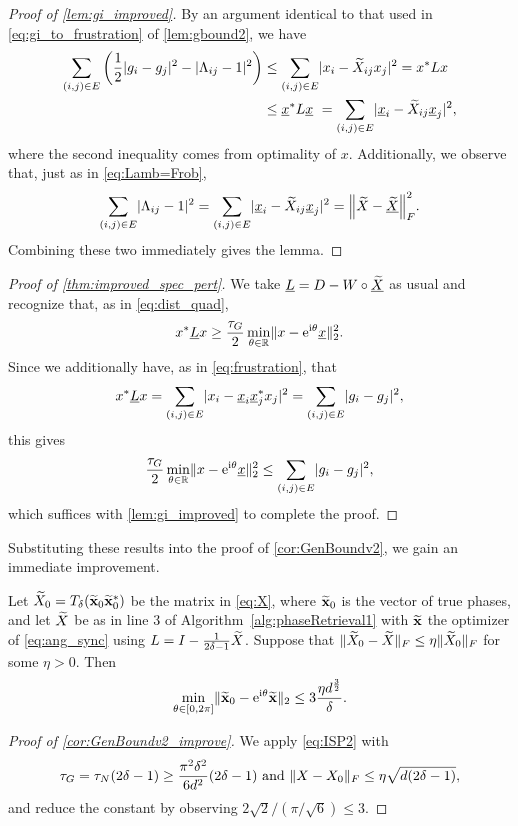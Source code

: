 \begin{proof}[Proof of \cref{lem:gi_improved}]
  By an argument identical to that used in \eqref{eq:gi_to_frustration} of \cref{lem:gbound2}, we have \begin{align*}\sum_{(i, j) \in E}  \left(\frac{1}{2} |g_i - g_j|^2 - |\Lambda_{ij} - 1|^2\right) &\le \sum_{(i, j) \in E}  \lvert x_i - \widetilde{X}_{ij} x_j\rvert^2 = x^* L x \\ &\le \underline{x}^* L \underline{x} \ = \sum_{(i, j) \in E}  \lvert\underline{x}_i - \widetilde{X}_{ij} \underline{x}_j\rvert^2,\end{align*} where the second inequality comes from optimality of $x$.  Additionally, we observe that, just as in \eqref{eq:Lamb=Frob}, \[\sumedge \abs{\Lambda_{ij} - 1}^2 = \sumedge  \abs{\ux_i - \tX_{ij} \ux_j}^2 = \norm*{\tX - \utX}_F^2.\]  Combining these two immediately gives the lemma.
\end{proof}

\begin{proof}[Proof of \cref{thm:improved_spec_pert}]
  We take $\underline{L} = D - W \circ \underline{\widetilde{X}}$ as usual and recognize that, as in \eqref{eq:dist_quad}, \[x^* \underline{L} x \ge \frac{\tau_G}{2} \min_{\theta \in \mathbb{R}} \lVert x - \mathrm{e}^{\mathrm{i}\theta} \underline{x}\rVert_2^2.\]  Since we additionally have, as in \eqref{eq:frustration}, that \[x^* \underline{L} x = \sum_{(i, j) \in E} \lvert x_i - \underline{x}_i \underline{x}_j^* x_j\rvert^2 = \sum_{(i, j) \in E}\lvert g_i - g_j\rvert^2,\] this gives \[\frac{\tau_G}{2} \min_{\theta \in \mathbb{R}} \lVert x - \mathrm{e}^{\mathrm{i}\theta} \underline{x}\rVert_2^2 \le \sum_{(i, j) \in E}\lvert g_i - g_j\rvert^2,\] which suffices with \cref{lem:gi_improved} to complete the proof.
\end{proof}

Substituting these results into the proof of \cref{cor:GenBoundv2}, we gain an immediate improvement.

\begin{corollary} \label{cor:GenBoundv2_improve}
  Let $\widetilde{X}_0 = T_\delta(\widetilde{\mathbf x}_0 \widetilde{\mathbf x}_0^*)$ be the matrix in \eqref{eq:X}, where $\widetilde{\mathbf x}_0$ is the vector of true phases, and let $\widetilde{X}$ be as in line 3 of Algorithm~\ref{alg:phaseRetrieval1} with $\widetilde{\mathbf x}$ the optimizer of \eqref{eq:ang_sync} using $L = I - \frac{1}{2 \delta - 1} \widetilde{X}$.  Suppose that $\lVert\widetilde{X}_0 - \widetilde{X}\rVert_F \le \eta \lVert\widetilde{X}_0\rVert_F$ for some $\eta > 0$.  Then
  \[\min_{\theta\in[0,2\pi]} \lVert\widetilde{\mathbf x}_0 - \mathrm{e}^{\mathrm{i} \theta} \widetilde{\mathbf x}\rVert_2 \le 3 \dfrac{\eta d^{\frac{3}{2}}}{\delta}.\]
\end{corollary}

\begin{proof}[Proof of \cref{cor:GenBoundv2_improve}]
  We apply \eqref{eq:ISP2} with \[\tau_G = \tau_N(2 \delta - 1) \ge \frac{\pi^2 \delta^2}{6 d^2}(2 \delta - 1) \ \text{and} \ \lVert X - X_0\rVert_F \le \eta \sqrt{d (2 \delta - 1)},\] and reduce the constant by observing $2 \sqrt{2} / (\pi / \sqrt{6}) \le 3$.
\end{proof}

